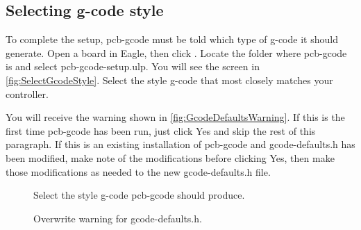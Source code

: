 \documentclass[11pt]{book}
\begin{document}
\subsection{Selecting g-code style}\label{sub:SelectingGCodeStyle}
To complete the setup, pcb-gcode must be told which type of g-code it should generate. Open a board in Eagle, then click . Locate the folder where pcb-gcode is and select pcb-gcode-setup.ulp. You will see the screen in \figurename \vref{fig:SelectGcodeStyle}. Select the style g-code that most closely matches your controller.

You will receive the warning shown in \figurename \vref{fig:GcodeDefaultsWarning}. If this is the first time pcb-gcode has been run, just click Yes and skip the rest of this paragraph. If this is an existing installation of pcb-gcode and gcode-defaults.h has been modified, make note of the modifications before clicking Yes, then make those modifications as needed to the new gcode-defaults.h file.

\begin{figure}
	\caption{Select the style g-code pcb-gcode should produce.}
	\label{fig:SelectGcodeStyle}
\end{figure}

\begin{figure}
	\caption{Overwrite warning for gcode-defaults.h.}
	\label{fig:GcodeDefaultsWarning}
\end{figure}
\end{document}
